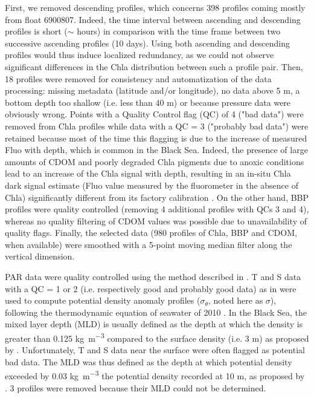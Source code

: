 \documentclass[journal abbreviation, manuscript]{copernicus}
\begin{document}
First, we removed descending profiles, which concerns 398 profiles coming mostly from float 6900807.
Indeed, the time interval between ascending and descending profiles is short ($\sim$ hours) in comparison with the time frame between two successive ascending profiles (10 days).
Using both ascending and descending profiles would thus induce localized redundancy, as we could not observe significant differences in the Chla distribution between such a profile pair.
Then, 18 profiles were removed for consistency and automatization of the data processing: missing metadata (latitude and/or longitude), no data above 5 \unit{m}, a bottom depth too shallow (i.e. less than 40 \unit{m}) 
or because pressure data were obviously wrong.
Points with a Quality Control flag (QC) of 4 ("bad data") were removed from Chla profiles \citep{ADMT2017, Schmechtig2018} while data with a QC = 3 ("probably bad data") were retained because most of the time this flagging is due to the increase of measured Fluo with depth, which is common in the Black Sea.
Indeed, the presence of large amounts of CDOM and poorly degraded Chla pigments due to anoxic conditions lead to an increase of the Chla signal with depth, resulting in an in-situ Chla dark signal estimate (Fluo value measured by the fluorometer in the absence of Chla) significantly different from its factory calibration \citep{Schmechtig2018}.
On the other hand, BBP profiles were quality controlled (removing 4 additional profiles with QCs 3 and 4), whereas no quality filtering of CDOM values was possible due to unavailability of quality flags.
Finally, the selected data (980 profiles of Chla, BBP and CDOM, when available) were smoothed with a 5-point moving median filter along the vertical dimension.%

PAR data were quality controlled using the method described in \citet{Organelli2016}.
T and S data with a QC = 1 or 2 (i.e. respectively good and probably good data) as in \citet{Wong2018} were used to compute potential density anomaly profiles ($\sigma_{\theta}$, noted here as $\sigma$), following the thermodynamic equation of seawater of 2010 \citep{IOC2010}.
In the Black Sea, the mixed layer depth (MLD) is usually defined as the depth at which the density is greater than 0.125 \unit{kg~m^{-3}} compared to the surface density (i.e. 3 \unit{m}) as proposed by \citet{Kara2009}.
Unfortunately, T and S data near the surface were often flagged as potential bad data.
The MLD was thus defined as the depth at which potential density exceeded by 0.03 \unit{kg~m^{-3}} the potential density recorded at 10 \unit{m}, as proposed by \citet{DeboyerMontegut2004}.
3 profiles were removed because their MLD could not be determined.
\end{document}
